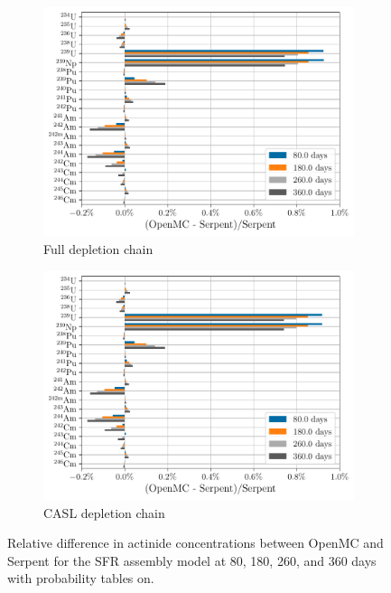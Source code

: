\documentclass[3p,authoryear]{elsarticle}
\begin{document}
\begin{figure}[H]
  \centering
  \begin{subfigure}[t]{0.45\textwidth}
    \includegraphics[width=\textwidth]{figures/sfr_actinides_full.pdf}
    \caption{Full depletion chain}
    \label{fig:sfr-actinides-full}
  \end{subfigure}
  \hspace{0.05\textwidth}
  \begin{subfigure}[t]{0.45\textwidth}
    \includegraphics[width=\textwidth]{figures/sfr_actinides_casl.pdf}
    \caption{CASL depletion chain}
    \label{fig:sfr-actinides-casl}
  \end{subfigure}
  \caption{Relative difference in actinide concentrations between OpenMC and
  Serpent for the SFR assembly model at 80, 180, 260, and 360 days with
  probability tables on.}
  \label{fig:sfr-actinides}
\end{figure}
\end{document}

